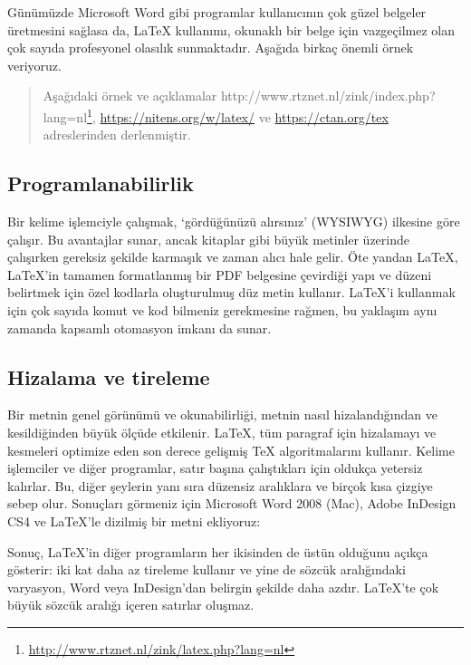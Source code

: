 \documentclass[
  10pt,
]{scrbook}
\renewcommand{\href}[2]{#2\footnote{\url{#1}}}
\begin{document}
Günümüzde Microsoft Word gibi programlar kullanıcının çok güzel belgeler
üretmesini sağlasa da, LaTeX kullanımı, okunaklı bir belge için
vazgeçilmez olan çok sayıda profesyonel olasılık sunmaktadır. Aşağıda
birkaç önemli örnek veriyoruz.

\begin{quote}
Aşağıdaki örnek ve açıklamalar
\href{http://www.rtznet.nl/zink/latex.php?lang=nl}{http://www.rtznet.nl/zink/index.php?lang=nl},
\url{https://nitens.org/w/latex/} ve
\url{https://ctan.org/tex} adreslerinden derlenmiştir.
\end{quote}

\hypertarget{programlanabilirlik}{%
\subsection{Programlanabilirlik}\label{programlanabilirlik}}

Bir kelime işlemciyle çalışmak, `gördüğünüzü alırsınız' (WYSIWYG)
ilkesine göre çalışır. Bu avantajlar sunar, ancak kitaplar gibi büyük
metinler üzerinde çalışırken gereksiz şekilde karmaşık ve zaman alıcı
hale gelir. Öte yandan LaTeX, LaTeX'in tamamen formatlanmış bir PDF
belgesine çevirdiği yapı ve düzeni belirtmek için özel kodlarla
oluşturulmuş düz metin kullanır. LaTeX'i kullanmak için çok sayıda komut
ve kod bilmeniz gerekmesine rağmen, bu yaklaşım aynı zamanda kapsamlı
otomasyon imkanı da sunar.

\hypertarget{hizalama-ve-tireleme}{%
\subsection{Hizalama ve tireleme}\label{hizalama-ve-tireleme}}

Bir metnin genel görünümü ve okunabilirliği, metnin nasıl
hizalandığından ve kesildiğinden büyük ölçüde etkilenir. LaTeX, tüm
paragraf için hizalamayı ve kesmeleri optimize eden son derece gelişmiş
TeX algoritmalarını kullanır. Kelime işlemciler ve diğer programlar,
satır başına çalıştıkları için oldukça yetersiz kalırlar. Bu, diğer
şeylerin yanı sıra düzensiz aralıklara ve birçok kısa çizgiye sebep
olur. Sonuçları görmeniz için Microsoft Word 2008 (Mac), Adobe InDesign
CS4 ve LaTeX'le dizilmiş bir metni ekliyoruz:

Sonuç, LaTeX'in diğer programların her ikisinden de üstün olduğunu
açıkça gösterir: iki kat daha az tireleme kullanır ve yine de sözcük
aralığındaki varyasyon, Word veya InDesign'dan belirgin şekilde daha
azdır. LaTeX'te çok büyük sözcük aralığı içeren satırlar oluşmaz.
\end{document}
